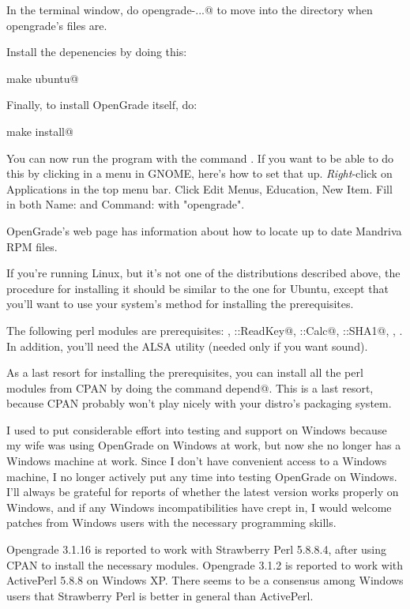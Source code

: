 \documentclass{opengrade_doc}
\begin{document}
In the terminal window, do \verb@cd opengrade-...@ to move into the directory when opengrade's files are.

Install the depenencies by doing this:

\verb@sudo make ubuntu@

Finally, to install OpenGrade itself, do:

\verb@sudo make install@

You can now run the program with the command \verb@opengrade@. If you want to be able to do this
by clicking in a menu in GNOME, here's how to set that up. \emph{Right}-click on Applications in the top
menu bar. Click Edit Menus, Education, New Item. Fill in both Name: and Command: with "opengrade".


OpenGrade's web page has information about how to locate up to date Mandriva RPM files.


If you're running Linux, but it's not one of the distributions described above,
the procedure for installing it should be similar to the one for Ubuntu, except that you'll want
to use your system's method for installing
the prerequisites.

The following perl modules are prerequisites:
\verb@Clone@,
\verb@Term::ReadKey@,
\verb@Date::Calc@,
\verb@Digest::SHA1@,
\verb@JSON@,
\verb@Tk@.
In addition, you'll need the ALSA \verb@aplay@ utility (needed only if you want sound).

As a last resort for installing the prerequisites, you can install all the perl modules from CPAN
by doing the command \verb@make depend@. This is a last resort, because CPAN probably won't play
nicely with your distro's packaging system.

I used to put considerable effort into testing and support on
Windows because my wife was using OpenGrade on Windows at work, but
now she no longer has a Windows machine at work. Since I don't have
convenient access to a Windows machine, I no longer actively put any
time into testing OpenGrade on Windows. I'll always be grateful for
reports of whether the latest version works properly on Windows, and
if any Windows incompatibilities have crept in, I would welcome
patches from Windows users with the necessary programming skills.

Opengrade 3.1.16 is reported to work with Strawberry Perl 5.8.8.4, after using CPAN to install the necessary
modules.
Opengrade 3.1.2 is reported to work with ActivePerl 5.8.8 on Windows
XP.
There seems to be a consensus among Windows users that Strawberry Perl is better in general than ActivePerl.
\end{document}
